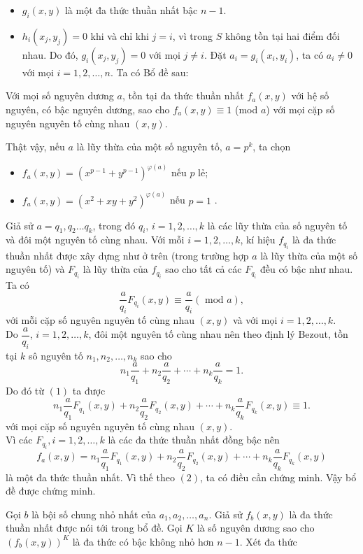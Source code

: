 \begin{bt}
{\begin{itemize}
			\item $g_i(x,y)$ là một đa thức thuần nhất bậc $n-1$.  
			\item $h_i(x_j,y_j) = 0$ khi và chỉ khi $j=i$, vì trong $S$ không tồn tại hai điểm đối nhau. Do đó, $g_i(x_j,y_j) = 0$ với mọi $j \ne i$. Đặt $a_i =g_i(x_i,y_i) $, ta có $a_i \ne 0$ với mọi $i = 1,2, \ldots, n$. Ta có Bổ đề sau:
		\end{itemize}
		\begin{bode}
			Với mọi số nguyên dương $a$, tồn tại đa thức thuần nhất $f_a(x,y)$ với hệ số nguyên, có bậc nguyên dương, sao cho $f_a(x,y) \equiv 1$ (mod $a$)  với mọi  cặp số nguyên nguyên tố cùng nhau $(x,y)$.
		\end{bode}
		\begin{cm}
			Thật vậy, nếu $a$ là lũy thừa của một số nguyên tố, $a = p^k$, ta chọn
			\begin{itemize}
				\item  $f_a(x,y) = (x^{p-1}+y^{p-1})^{ \varphi(a)}$ nếu $p$ lẻ;
				\item  $f_a(x,y) = (x^2+xy+y^2)^{ \varphi(a)}$ nếu $p = 1$ .
			\end{itemize}
			Giả sử $a=q_1, q_2 \ldots q_k$, trong đó $q_i$, $i = 1,2,\ldots ,k$ là các lũy thừa của số nguyên tố và đôi một nguyên tố cùng nhau. Với mỗi   $i = 1,2,\ldots ,k$, kí hiệu $f_{q_i}$ là đa thức thuần nhất được xây dựng như ở trên (trong trường hợp $a$ là lũy thừa của một số nguyên tố) và $F_{q_i}$ là lũy thừa của $f_{q_i}$ sao cho tất cả các $F_{q_i}$ đều có bậc như nhau. Ta có
		\[\dfrac{a}{q_i}F_{q_i}(x,y)  \equiv \dfrac{a}{q_i} (\text{ mod } a),\tag{1}\] 
		với mỗi cặp số  nguyên nguyên tố cùng nhau $(x,y)$ và với mọi $i = 1,2,\ldots,k$.\\
			Do $\dfrac{a}{q_i}$, $i=1,2,\ldots, k$, đôi một nguyên tố cùng nhau nên theo định lý Bezout, tồn tại $k$ sô nguyên tố $n_1,n_2,\ldots,n_k$ sao cho $$n_1\dfrac{a}{q_1}+n_2\dfrac{a}{q_2}+\cdots+ n_k\dfrac{a}{q_k} =1.$$
			Do đó từ $(1)$ ta được
		\[n_1\dfrac{a}{q_1}F_{q_1}(x,y)+n_2\dfrac{a}{q_2}F_{q_2}(x,y)+\cdots+ n_k\dfrac{a}{q_k}F_{q_k}(x,y) \equiv 1.\tag{2}\] 
		với mọi cặp số nguyên nguyên tố cùng nhau $(x,y)$.\\
			Vì các $F_{q_i}, i = 1,2,\ldots, k$ là các đa thức thuần nhất đồng bậc nên
			$$f_a(x,y)= n_1\dfrac{a}{q_1}F_{q_1}(x,y)+n_2\dfrac{a}{q_2}F_{q_2}(x,y)+\cdots+ n_k\dfrac{a}{q_k}F_{q_k}(x,y)  $$
			là một đa thức thuần nhất. Vì thế theo $(2)$, ta có điều cần chứng minh. Vậy bổ đề được chứng minh.
		\end{cm}
		Gọi $b$ là bội số chung nhỏ nhất của $a_1,a_2, \ldots, a_n$. Giả sử $f_b(x,y)$ là đa thức thuần nhất được nói tới trong bổ đề. Gọi $K$ là số nguyên dương sao cho $(f_b(x,y))^K$ là đa thức có bậc không nhỏ hơn $n-1$. Xét đa thức 
}
\end{bt}
